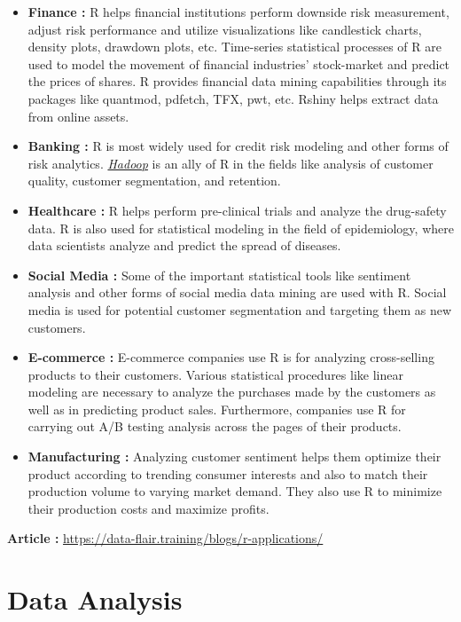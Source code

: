 \documentclass[
  letterpaper,
  DIV=11,
  numbers=noendperiod]{scrreprt}
\begin{document}
\begin{itemize}
\item
  \textbf{Finance :} R helps financial institutions perform downside
  risk measurement, adjust risk performance and utilize visualizations
  like candlestick charts, density plots, drawdown plots, etc.
  Time-series statistical processes of R are used to model the movement
  of financial industries' stock-market and predict the prices of
  shares. R provides financial data mining capabilities through its
  packages like quantmod, pdfetch, TFX, pwt, etc. Rshiny helps extract
  data from online assets.
\item
  \textbf{Banking :} R is most widely used for credit risk modeling and
  other forms of risk analytics.
  \href{https://data-flair.training/blogs/hadoop-tutorials-home/}{\emph{Hadoop}}
  is an ally of R in the fields like analysis of customer quality,
  customer segmentation, and retention.
\item
  \textbf{Healthcare :} R helps perform pre-clinical trials and analyze
  the drug-safety data. R is also used for statistical modeling in the
  field of epidemiology, where data scientists analyze and predict the
  spread of diseases.
\item
  \textbf{Social Media :} Some of the important statistical tools like
  sentiment analysis and other forms of social media data mining are
  used with R. Social media is used for potential customer segmentation
  and targeting them as new customers.
\item
  \textbf{E-commerce :} E-commerce companies use R is for analyzing
  cross-selling products to their customers. Various statistical
  procedures like linear modeling are necessary to analyze the purchases
  made by the customers as well as in predicting product sales.
  Furthermore, companies use R for carrying out A/B testing analysis
  across the pages of their products.
\item
  \textbf{Manufacturing :} Analyzing customer sentiment helps them
  optimize their product according to trending consumer interests and
  also to match their production volume to varying market demand. They
  also use R to minimize their production costs and maximize profits.
\end{itemize}

\textbf{Article :}
\url{https://data-flair.training/blogs/r-applications/}

\hypertarget{data-analysis}{%
\section{Data Analysis}\label{data-analysis}}
\end{document}

